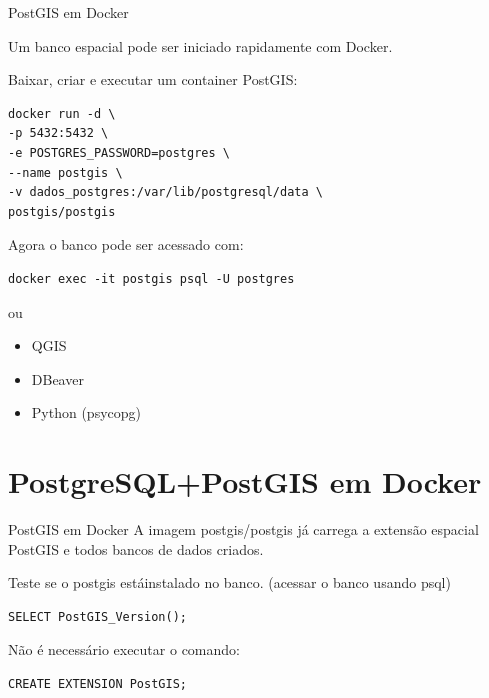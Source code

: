 \documentclass{beamer}
\begin{document}
\begin{frame}[fragile]{PostGIS em Docker}
    
    Um banco espacial pode ser iniciado rapidamente com Docker.
    
    \vspace{0.3cm}
    
    Baixar, criar e executar um container PostGIS:
    
    \begin{verbatim}
docker run -d \
-p 5432:5432 \
-e POSTGRES_PASSWORD=postgres \
--name postgis \
-v dados_postgres:/var/lib/postgresql/data \
postgis/postgis
    \end{verbatim}
    
    Agora o banco pode ser acessado com:
    \begin{verbatim}
docker exec -it postgis psql -U postgres
    \end{verbatim}
    ou
    \begin{itemize}
        \item QGIS
        \item DBeaver
        \item Python (psycopg)
    \end{itemize}
    

    
\end{frame}

\section{PostgreSQL+PostGIS em Docker}

\begin{frame}[fragile]{PostGIS em Docker}
    A imagem postgis/postgis já carrega a extensão espacial PostGIS e todos bancos de dados criados. 
    \vspace{0.3cm}

    Teste se o postgis estáinstalado no banco. (acessar o banco usando psql)
    
    \begin{verbatim}
SELECT PostGIS_Version();
    \end{verbatim}

    Não é necessário executar o comando: 
    \begin{verbatim}
CREATE EXTENSION PostGIS;
    \end{verbatim}

\end{frame}
\end{document}
